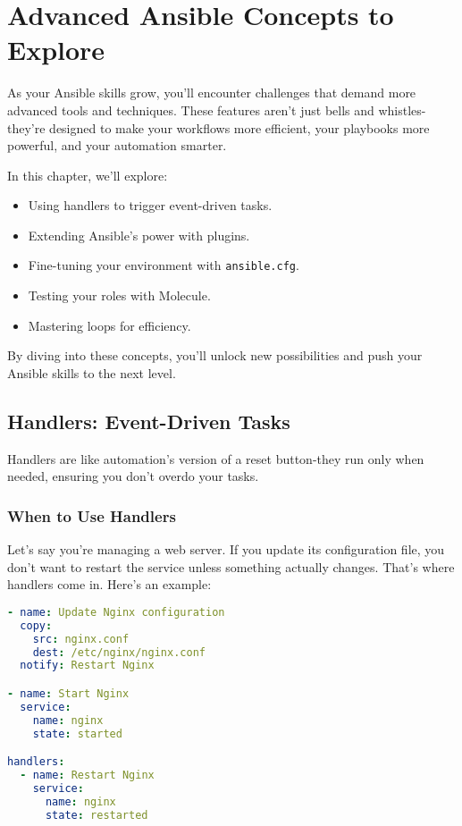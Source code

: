 \chapter{Advanced Ansible Concepts to Explore}

As your Ansible skills grow, you'll encounter challenges that demand more advanced tools and techniques. These features aren't just bells and whistles-they're designed to make your workflows more efficient, your playbooks more powerful, and your automation smarter.  

In this chapter, we'll explore:
\begin{itemize}
    \item Using handlers to trigger event-driven tasks.
    \item Extending Ansible's power with plugins.
    \item Fine-tuning your environment with \texttt{ansible.cfg}.
    \item Testing your roles with Molecule.
    \item Mastering loops for efficiency.
\end{itemize}

By diving into these concepts, you'll unlock new possibilities and push your Ansible skills to the next level.


\section{Handlers: Event-Driven Tasks}

Handlers are like automation's version of a reset button-they run only when needed, ensuring you don't overdo your tasks.

\subsection{When to Use Handlers}

Let's say you're managing a web server. If you update its configuration file, you don't want to restart the service unless something actually changes. That's where handlers come in. Here's an example:
\begin{lstlisting}[language=yaml, caption=Using Handlers for Service Restarts]
- name: Update Nginx configuration
  copy:
    src: nginx.conf
    dest: /etc/nginx/nginx.conf
  notify: Restart Nginx

- name: Start Nginx
  service:
    name: nginx
    state: started

handlers:
  - name: Restart Nginx
    service:
      name: nginx
      state: restarted
\end{lstlisting}

